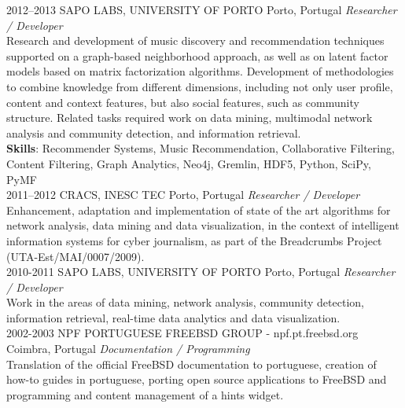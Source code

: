 \documentclass{friggeri-cv}
\begin{document}
\begin{entrylist}
\entry
{2012--2013}
{SAPO LABS, UNIVERSITY OF PORTO}
{Porto, Portugal}
{\emph{Researcher / Developer}\\[-.5em]

Research and development of music discovery and recommendation techniques supported on a graph-based neighborhood approach, as well as on latent factor models based on matrix factorization algorithms. Development of methodologies to combine knowledge from different dimensions, including not only user profile, content and context features, but also social features, such as community structure. Related tasks required work on data mining, multimodal network analysis and community detection, and information retrieval.\\

{\small \textbf{Skills}: Recommender Systems, Music Recommendation, Collaborative Filtering, Content Filtering, Graph Analytics, Neo4j, Gremlin, HDF5, Python, SciPy, PyMF}\\}
\entry
{2011--2012}
{CRACS, INESC TEC}
{Porto, Portugal}
{\emph{Researcher / Developer}\\[-.5em]

Enhancement, adaptation and implementation of state of the art algorithms for network analysis, data mining and data visualization, in the context of intelligent information systems for cyber journalism, as part of the Breadcrumbs Project (UTA-Est/MAI/0007/2009).\\}
\entry
{2010-2011}
{SAPO LABS, UNIVERSITY OF PORTO}
{Porto, Portugal}
{\emph{Researcher / Developer}\\[-.5em]

Work in the areas of data mining, network analysis, community detection, information retrieval, real-time data analytics and data visualization.\\}
\entry
{2002-2003}
{NPF PORTUGUESE FREEBSD GROUP - npf.pt.freebsd.org}
{Coimbra, Portugal}
{\emph{Documentation / Programming}\\[-.5em]

Translation of the official FreeBSD documentation to portuguese, creation of how-to guides in portuguese, porting open source applications to FreeBSD and programming and content management of a hints widget.}
\end{entrylist}
\end{document}
